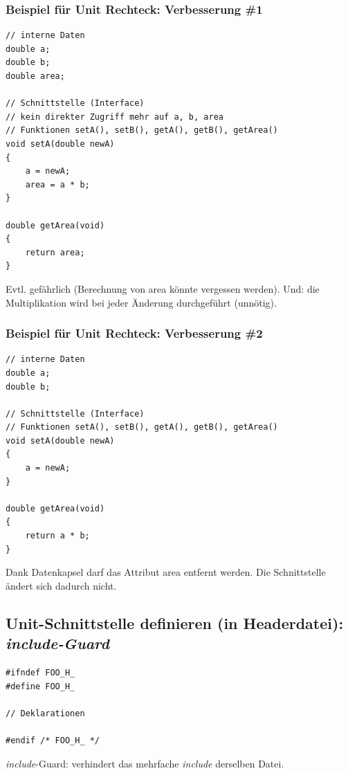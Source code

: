 \vspace{-\baselineskip}
\begin{multicols}{2}
\subsubsection{Beispiel für Unit Rechteck: Verbesserung \#1}
\vspace{-\baselineskip}
\begin{minipage}{\linewidth}
\begin{lstlisting}
// interne Daten
double a;
double b;
double area;

// Schnittstelle (Interface)
// kein direkter Zugriff mehr auf a, b, area
// Funktionen setA(), setB(), getA(), getB(), getArea()
void setA(double newA)
{
	a = newA;
	area = a * b;
}

double getArea(void)
{
	return area;
}
\end{lstlisting}
\end{minipage}
\begin{hinweis}
	Evtl. gefährlich (Berechnung von area könnte vergessen werden). Und: die Multiplikation wird bei jeder Änderung durchgeführt (unnötig).
\end{hinweis}
\columnbreak
\subsubsection{Beispiel für Unit Rechteck: Verbesserung \#2}
\vspace{-\baselineskip}
\begin{minipage}{\linewidth}
\begin{lstlisting}
// interne Daten
double a;
double b;

// Schnittstelle (Interface)
// Funktionen setA(), setB(), getA(), getB(), getArea()
void setA(double newA)
{
	a = newA;
}

double getArea(void)
{
	return a * b;
}
\end{lstlisting}
\end{minipage}
\begin{hinweis}
	Dank Datenkapsel darf das Attribut area entfernt werden. Die Schnittstelle ändert sich dadurch nicht.
\end{hinweis}
\end{multicols}

\subsection{Unit-Schnittstelle definieren (in Headerdatei): \emph{include-Guard}}
\begin{minipage}{\linewidth}
\begin{lstlisting}
#ifndef FOO_H_
#define FOO_H_

// Deklarationen

#endif /* FOO_H_ */
\end{lstlisting}
\end{minipage}
\begin{hinweis}
\emph{include}-Guard: verhindert das mehrfache \emph{include} derselben Datei.
\end{hinweis}


